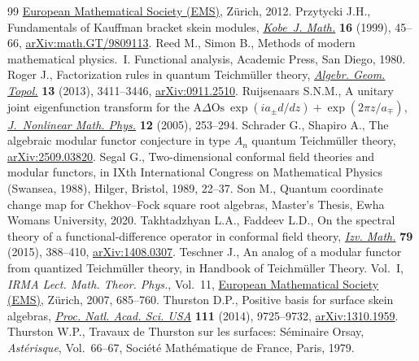 \documentclass[pdftex]{sigma}
\numberwithin{equation}{section}
\theoremstyle{definition}
\begin{document}
\begin{thebibliography}{99}
 \href{https://doi.org/10.4171/075}{European Mathematical Society (EMS)},
 Z\"{u}rich, 2012.
Przytycki J.H., Fundamentals of {K}auffman bracket skein modules,
 \href{https://doi.org/10.24546/E0003677}{\textit{Kobe~J. Math.}} \textbf{16}
 (1999), 45--66,
 \href{http://arxiv.org/abs/math.GT/9809113}{arXiv:math.GT/9809113}.
Reed M., Simon B., Methods of modern mathematical physics.~{I}. {F}unctional
 analysis, Academic Press, San Diego, 1980.
Roger J., Factorization rules in quantum {T}eichm\"{u}ller theory,
 \href{https://doi.org/10.2140/agt.2013.13.3411}{\textit{Algebr. Geom.
 Topol.}} \textbf{13} (2013), 3411--3446,
 \href{http://arxiv.org/abs/0911.2510}{arXiv:0911.2510}.
Ruijsenaars S.N.M., A unitary joint eigenfunction transform for the {$\mathrm{
 A}\Delta \mathrm{Os}\ \exp(ia_\pm d/dz)+\exp(2\pi z/a_\mp)$},
 \href{https://doi.org/10.2991/jnmp.2005.12.s2.19}{\textit{J.~Nonlinear Math.
 Phys.}} \textbf{12} (2005), 253--294.
Schrader G., Shapiro A., The algebraic modular functor conjecture in type $A_n$
 quantum {T}eichm\"{u}ller theory,
 \href{http://arxiv.org/abs/2509.03820}{arXiv:2509.03820}.
Segal G., Two-dimensional conformal field theories and modular functors, in
 I{X}th {I}nternational {C}ongress on {M}athematical {P}hysics ({S}wansea,
 1988), Hilger, Bristol, 1989, 22--37.
Son M., Quantum coordinate change map for {C}hekhov--{F}ock square root
 algebras, {M}aster's Thesis, Ewha Womans University, 2020.
Takhtadzhyan L.A., Faddeev L.D., On the spectral theory of a
 functional-difference operator in conformal field theory,
 \href{https://doi.org/10.1070/IM2015v079n02ABEH002747}{\textit{Izv. Math.}}
 \textbf{79} (2015), 388--410,
 \href{http://arxiv.org/abs/1408.0307}{arXiv:1408.0307}.
Teschner J., An analog of a modular functor from quantized {T}eichm\"{u}ller
 theory, in Handbook of {T}eichm\"{u}ller Theory. {V}ol.~{I}, \textit{IRMA
 Lect. Math. Theor. Phys.}, Vol.~11,
 \href{https://doi.org/10.4171/029-1/17}{European Mathematical Society (EMS)},
 Z\"{u}rich, 2007, 685--760.
Thurston D.P., Positive basis for surface skein algebras,
 \href{https://doi.org/10.1073/pnas.1313070111}{\textit{Proc. Natl. Acad. Sci.
 USA}} \textbf{111} (2014), 9725--9732,
 \href{http://arxiv.org/abs/1310.1959}{arXiv:1310.1959}.
Thurston W.P., Travaux de {T}hurston sur les surfaces: {S}\'{e}minaire {O}rsay,
 \textit{Ast\'{e}risque}, Vol.~66--67, Soci\'{e}t\'{e} Math\'{e}matique de
 France, Paris, 1979.

\end{thebibliography}
\end{document}
